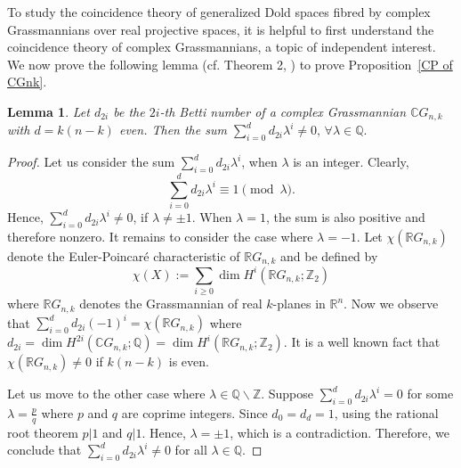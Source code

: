 \documentclass{amsart}
\newtheorem{lemma}[theorem]{Lemma}
\newcommand{\propref}[1]{Proposition~\ref{#1}}
\begin{document}
	To study the coincidence theory of generalized Dold spaces fibred by complex Grassmannians over real projective spaces, it is helpful to first understand the coincidence theory of complex Grassmannians, a topic of independent interest. We now %
prove the following lemma (cf. Theorem 2, \cite{glover-homer}) to %
prove \propref{CP of CGnk}.
	\begin{lemma}\label{sum neq 0}
		Let $d_{2i}$ be the $2i$-th Betti number of a complex Grassmannian $\mathbb CG_{n,k}$ with $d=k(n-k)$ even. Then the sum \(\sum _{i=0}^d d_{2i}\lambda^i\neq 0,\, \forall \lambda \in \mathbb Q.\)
	\end{lemma}
	\begin{proof}
		Let us consider the sum $\sum_{i=0}^d d_{2i}\lambda^i$, when $\lambda$ is an integer. 
		Clearly, $$\sum_{i=0}^d d_{2i}\lambda^i \equiv 1 \pmod{\lambda}.$$ %
		Hence, $\sum_{i=0}^d d_{2i}\lambda^i \neq 0$, if $\lambda \neq \pm 1$. When $\lambda = 1$, the sum is also positive and therefore nonzero. It remains to consider the case where $\lambda = -1$.
		Let $\chi(\mathbb{R}G_{n,k})$ denote the Euler-Poincaré characteristic of $\mathbb{R}G_{n,k}$ and be defined by $$\chi(X):=\sum_{i\ge0}\dim H^i(\mathbb{R}G_{n,k};\mathbb{Z}_2)$$ where $\mathbb{R}G_{n,k}$ denotes the Grassmannian of real $k$-planes in $\mathbb{R}^n$.
		Now we observe %
that 
		$\sum_{i=0}^d d_{2i}(-1)^i = \chi(\mathbb{R}G_{n,k})$ where %
$d_{2i} = \operatorname{dim} H^{2i}(\mathbb{C}G_{n,k}; \mathbb{Q}) = \dim H^{i}(\mathbb{R}G_{n,k}; \mathbb{Z}_2)$. 
		It is a well known fact that $\chi(\mathbb{R}G_{n,k}) \neq 0$ if $k(n-k)$ is even. 
		
		Let us move to the other case where $\lambda\in \mathbb{Q}\backslash \mathbb{Z}$. Suppose $\sum_{i=0}^{d} d_{2i}\lambda^i =0$ for some $\lambda = \frac{p}{q}$ where $p$ and $q$ are coprime integers. Since $d_0 =d_d =1$, using the rational %
root theorem $p|1$ %
and $q|1$. Hence, $\lambda = \pm 1$, which is a contradiction. Therefore, we conclude that $\sum_{i=0}^{d} d_{2i}\lambda^i \neq 0$ for all $\lambda\in \mathbb Q$. 
	\end{proof}
	
\end{document}
